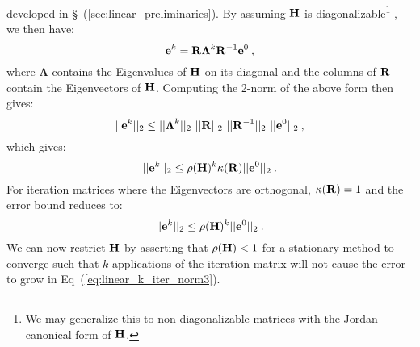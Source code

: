 developed in \S~(\ref{sec:linear_preliminaries}). By assuming $\mathbf{H}$
is diagonalizable\footnote{We may generalize this to
  non-diagonalizable matrices with the Jordan canonical form of
  $\mathbf{H}$.} \citep{saad_iterative_2003}, we then have:
\begin{equation}
  \mathbf{e}^{k} =
  \mathbf{R}\boldsymbol{\Lambda}^k\mathbf{R}^{-1}\mathbf{e}^0\:,
  \label{eq:linear_k_iter_error_diag}
\end{equation}
where $\boldsymbol{\Lambda}$ contains the Eigenvalues of $\mathbf{H}$ on
its diagonal and the columns of $\mathbf{R}$ contain the Eigenvectors of
$\mathbf{H}$. Computing the 2-norm of the above form then gives:
\begin{equation}
  ||\ve{e}^{k}||_2 \leq ||\boldsymbol{\Lambda}^k||_2\ 
  ||\ve{R}||_2\ ||\ve{R}^{-1}||_2\ ||\ve{e}^0||_2\:,
  \label{eq:linear_k_iter_norm1}
\end{equation}
which gives:
\begin{equation}
  ||\mathbf{e}^{k}||_2 \leq \rho(\mathbf{H})^k \kappa(\mathbf{R})
  ||\mathbf{e}^0||_2\:.
  \label{eq:linear_k_iter_norm2}
\end{equation}
For iteration matrices where the Eigenvectors are orthogonal,
$\kappa(\mathbf{R})=1$ and the error bound reduces to:
\begin{equation}
  ||\mathbf{e}^{k}||_2 \leq \rho(\mathbf{H})^k
  ||\mathbf{e}^0||_2\:.
  \label{eq:linear_k_iter_norm3}
\end{equation}
We can now restrict $\mathbf{H}$ by asserting that $\rho(\mathbf{H}) < 1$
for a stationary method to converge such that $k$ applications of the
iteration matrix will not cause the error to grow in
Eq~(\ref{eq:linear_k_iter_norm3}). 

